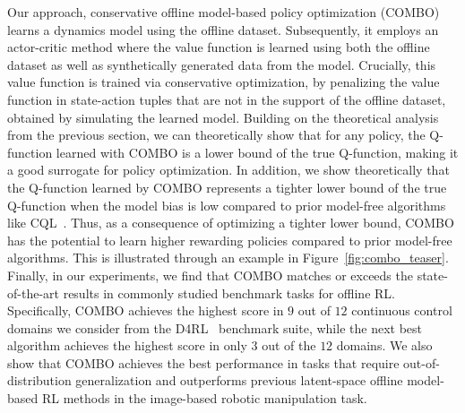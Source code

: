 \documentclass[../thesis.tex]{subfiles}
\begin{document}
Our approach, conservative offline model-based policy optimization (COMBO) learns a dynamics model using the offline dataset. Subsequently, it employs an actor-critic method where the value function is learned using both the offline dataset as well as synthetically generated data from the model. Crucially, this value function is trained via conservative optimization, by penalizing the value function in state-action tuples that are not in the support of the offline dataset, obtained by simulating the learned model. 
%
Building on the theoretical analysis from the previous section, we can theoretically show that for any policy, the Q-function learned with COMBO is a lower bound of the true Q-function, making it a good surrogate for policy optimization.
In addition, we show theoretically that the Q-function learned by COMBO represents a tighter lower bound of the true Q-function when the model bias is low compared to prior model-free algorithms like CQL~\cite{kumar2020conservative}.
Thus, as a consequence of optimizing a tighter lower bound, COMBO has the potential to learn higher rewarding policies compared to prior model-free algorithms. This is illustrated through an example in Figure~\ref{fig:combo_teaser}.
Finally, in our experiments, we find that COMBO matches or exceeds the state-of-the-art results in commonly studied benchmark tasks for offline RL. Specifically, COMBO achieves the highest score in $9$ out of $12$ continuous control domains we consider from the D4RL~\cite{fu2020d4rl} benchmark suite, while the next best algorithm achieves the highest score in only $3$ out of the $12$ domains. We also show that COMBO achieves the best performance in tasks that require out-of-distribution generalization and outperforms previous latent-space offline model-based RL methods in the image-based robotic manipulation task.%
\end{document}
